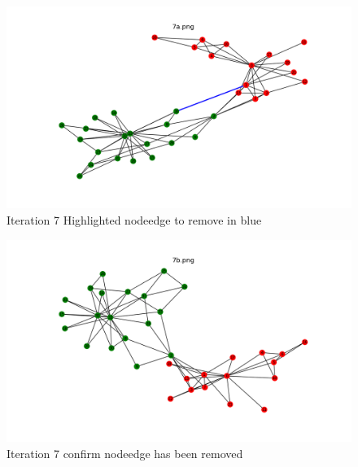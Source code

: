 \documentclass[12pt]{article}
\begin{document}
\begin{figure}[H]
\centering
\includegraphics[trim=0 0 0 0, clip, width=\textwidth] {7a.png}
\caption{Iteration 7 Highlighted nodeedge to remove in blue }
\label{fig:q17a}
\end{figure}
\begin{figure}[H]
\centering
\includegraphics[trim=0 0 0 0, clip, width=\textwidth] {7b.png}
\caption{Iteration 7 confirm nodeedge has been removed }
\label{fig:q17b}
\end{figure}
\end{document}
